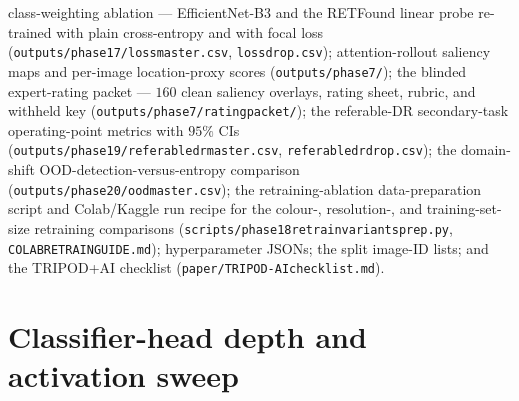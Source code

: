 \documentclass[journal]{IEEEtran}
\renewcommand{\_}{\origunderscore\allowbreak}
\begin{document}
{class-weighting ablation --- EfficientNet-B3 and the RETFound linear probe
re-trained with plain cross-entropy and with focal loss
(\texttt{outputs/\allowbreak{}phase17/\allowbreak{}loss\_master.csv}, \texttt{loss\_drop.csv});
attention-rollout saliency maps and per-image location-proxy scores
(\texttt{outputs/\allowbreak{}phase7/\allowbreak{}}); the blinded expert-rating packet --- $160$ clean
saliency overlays, rating sheet, rubric, and withheld key
(\texttt{outputs/\allowbreak{}phase7/\allowbreak{}rating\_packet/\allowbreak{}}); the referable-DR secondary-task
operating-point metrics with $95\%$ CIs
(\texttt{outputs/\allowbreak{}phase19/\allowbreak{}referable\_dr\_master.csv},
\texttt{referable\_dr\_drop.csv}); the domain-shift OOD-detection-versus-entropy
comparison (\texttt{outputs/\allowbreak{}phase20/\allowbreak{}ood\_master.csv}); the retraining-ablation
data-preparation script and Colab/Kaggle run recipe for the colour-,
resolution-, and training-set-size retraining comparisons
(\texttt{scripts/\allowbreak{}phase18\_retrain\_variants\_prep.py},
\texttt{COLAB\_RETRAIN\_GUIDE.md}); hyperparameter JSONs; the split image-ID
lists; and the TRIPOD+AI checklist (\texttt{paper/\allowbreak{}TRIPOD-AI\_checklist.md}).
\par}


\appendices
\section{Classifier-head depth and activation sweep}
\label{sec:results-headdepth}
\end{document}
